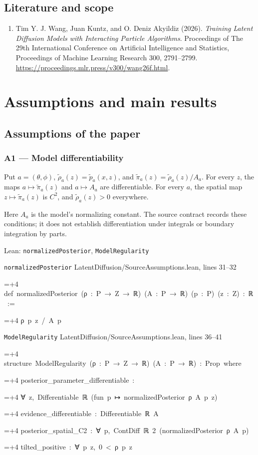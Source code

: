 \documentclass[11pt,a4paper]{report}
\newlength{\leancharwidth}
\newenvironment{leancode}{\par\smallskip\begingroup\ttfamily\footnotesize\raggedright
  \settowidth{\leancharwidth}{M}\setlength{\parskip}{0pt}\setlength{\parindent}{0pt}
  \frenchspacing}{\par\endgroup\smallskip}
\newcommand{\leanline}[2]{\hangindent=\dimexpr#1\leancharwidth+4\leancharwidth\relax
  \hangafter=1\noindent\hspace*{#1\leancharwidth}#2\par}
\newcommand{\leansource}[1]{\par{\footnotesize\color{leanmuted}#1}\par}
\begin{document}
\section*{Literature and scope}
\begin{enumerate}
\item Tim Y. J. Wang, Juan Kuntz, and O. Deniz Akyildiz (2026). \emph{Training Latent Diffusion Models with Interacting Particle Algorithms}. Proceedings of The 29th International Conference on Artificial Intelligence and Statistics, Proceedings of Machine Learning Research 300, 2791–2799. \url{https://proceedings.mlr.press/v300/wang26f.html}.
\end{enumerate}
\tableofcontents
\clearpage
{}
\chapter{Assumptions and main results}
\section{Assumptions of the paper}
\subsection{\texorpdfstring{A1 — Model differentiability}{A1 — Model differentiability}}



Put \(a=(\theta,\phi)\), \(\tilde\rho_a(z)=\tilde p_a(x,z)\), and \(\tilde\pi_a(z)=\tilde\rho_a(z)/A_a\). For every \(z\), the maps \(a\mapsto\tilde\pi_a(z)\) and \(a\mapsto A_a\) are differentiable. For every \(a\), the spatial map \(z\mapsto\tilde\pi_a(z)\) is \(C^2\), and \(\tilde\rho_a(z)>0\) everywhere.




Here \(A_a\) is the model's normalizing constant. The source contract records these conditions; it does not establish differentiation under integrals or boundary integration by parts.

\begin{leanbox}{Lean: \texttt{normalizedPosterior}, \texttt{ModelRegularity}}
\leansource{\texttt{normalizedPosterior} \quad LatentDiffusion/\allowbreak{}SourceAssumptions.lean, lines 31–32}
\begin{leancode}
\leanline{0}{def\ normalizedPosterior\ (ρ\ :\ P\ →\ Z\ →\ ℝ)\ (A\ :\ P\ →\ ℝ)\ (p\ :\ P)\ (z\ :\ Z)\ :\ ℝ\ :=}
\leanline{2}{ρ\ p\ z\ /\ A\ p}
\end{leancode}
\leansource{\texttt{ModelRegularity} \quad LatentDiffusion/\allowbreak{}SourceAssumptions.lean, lines 36–41}
\begin{leancode}
\leanline{0}{structure\ ModelRegularity\ (ρ\ :\ P\ →\ Z\ →\ ℝ)\ (A\ :\ P\ →\ ℝ)\ :\ Prop\ where}
\leanline{2}{posterior\_parameter\_differentiable\ :}
\leanline{4}{∀\ z,\ Differentiable\ ℝ\ (fun\ p\ ↦\ normalizedPosterior\ ρ\ A\ p\ z)}
\leanline{2}{evidence\_differentiable\ :\ Differentiable\ ℝ\ A}
\leanline{2}{posterior\_spatial\_C2\ :\ ∀\ p,\ ContDiff\ ℝ\ 2\ (normalizedPosterior\ ρ\ A\ p)}
\leanline{2}{tilted\_positive\ :\ ∀\ p\ z,\ 0\ <\ ρ\ p\ z}
\end{leancode}
\end{leanbox}
\end{document}
